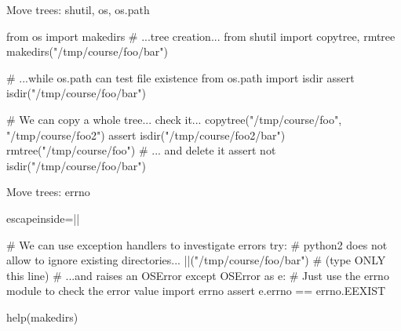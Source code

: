 \begin{pyframe}{Move trees: shutil, os, os.path}
\begin{pycode}
from os import makedirs     # ...tree creation...
from shutil import copytree, rmtree 
makedirs("/tmp/course/foo/bar")

# ...while os.path can test file existence
from os.path import isdir            
assert isdir("/tmp/course/foo/bar")

# We can copy a whole tree... check it...
copytree("/tmp/course/foo", "/tmp/course/foo2") 
assert isdir("/tmp/course/foo2/bar")            
rmtree("/tmp/course/foo") # ... and delete it
assert not isdir("/tmp/course/foo/bar")
\end{pycode}
\end{pyframe}

\begin{pyframe}{Move trees: errno}
\begin{pycode*}{escapeinside=||}

# We can use exception handlers to investigate errors
try:
    # python2 does not allow to ignore existing directories...
    ||("/tmp/course/foo/bar") # (type ONLY this line)
    #  ...and raises an OSError
except OSError as e:
    # Just use the errno module to check the error value
    import errno
    assert e.errno == errno.EEXIST
    
help(makedirs)
\end{pycode*}
\end{pyframe}

